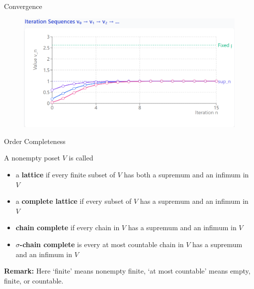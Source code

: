 \begin{frame}{Convergence}
\begin{figure}
    \centering
    \includegraphics[width=1\linewidth]{Dynamic Programming/DP2/Chapter 1/Section 1.2/figure/convergence.png}
\end{figure}
\end{frame}

\begin{frame}{Order Completeness}
\begin{definition}
    A nonempty poset $V$ is called
    \begin{itemize}
        \item a \textbf{lattice} if every finite subset of $V$ has both a supremum and an infimum in $V$
        \item a \textbf{complete lattice} if every subset of $V$ has a supremum and an infimum in $V$
        \item \textbf{chain complete} if every chain in $V$ has a supremum and an infimum in $V$
        \item \textbf{$\sigma$-chain complete} is every at most countable chain in $V$ has a supremum and an infimum in $V$
    \end{itemize}
\end{definition}
\textbf{Remark:} Here  `finite' means nonempty finite, `at most countable' means empty, finite, or countable. 
    
\end{frame}

